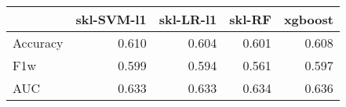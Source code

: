 \begin{tabular}{lrrrr}
\toprule
{} &  skl-SVM-l1 &  skl-LR-l1 &  skl-RF &  xgboost \\
\midrule
Accuracy &       0.610 &      0.604 &   0.601 &    0.608 \\
F1w      &       0.599 &      0.594 &   0.561 &    0.597 \\
AUC      &       0.633 &      0.633 &   0.634 &    0.636 \\
\bottomrule
\end{tabular}
